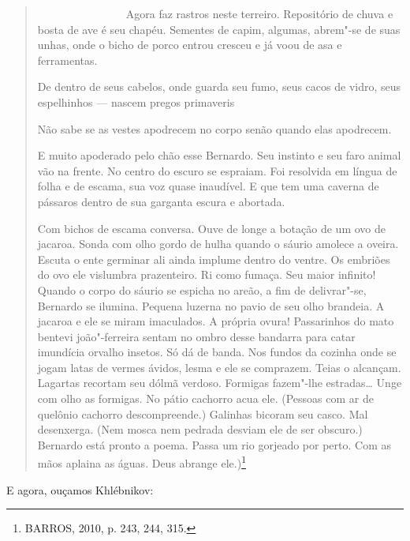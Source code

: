 \begin{quote}
~~~~~~~~~~~~~~~~Agora faz rastros neste terreiro. Repositório de chuva e
bosta de ave é seu chapéu. Sementes de capim, algumas, abrem"-se de suas
unhas, onde o bicho de porco entrou cresceu e já voou de asa e
ferramentas.

De dentro de seus cabelos, onde guarda seu fumo, seus cacos de vidro,
seus espelhinhos --- nascem pregos primaveris

Não sabe se as vestes apodrecem no corpo senão quando elas apodrecem.

E muito apoderado pelo chão esse Bernardo. Seu instinto e seu faro
animal vão na frente. No centro do escuro se espraiam. Foi resolvida em
língua de folha e de escama, sua voz quase inaudível. E que tem uma
caverna de pássaros dentro de sua garganta escura e abortada.

Com bichos de escama conversa. Ouve de longe a botação de um ovo de
jacaroa. Sonda com olho gordo de hulha quando o sáurio amolece a oveira.
Escuta o ente germinar ali ainda implume dentro do ventre. Os embriões
do ovo ele vislumbra prazenteiro. Ri como fumaça. Seu maior infinito!
Quando o corpo do sáurio se espicha no areão, a fim de delivrar"-se,
Bernardo se ilumina. Pequena luzerna no pavio de seu olho brandeia. A
jacaroa e ele se miram imaculados. A própria ovura! Passarinhos do mato
bentevi joão"-ferreira sentam no ombro desse bandarra para catar
imundícia orvalho insetos. Só dá de banda. Nos fundos da cozinha onde se
jogam latas de vermes ávidos, lesma e ele se comprazem. Teias o
alcançam. Lagartas recortam seu dólmã verdoso. Formigas fazem"-lhe
estradas\ldots{} Unge com olho as formigas. No pátio cachorro acua ele.
(Pessoas com ar de quelônio cachorro descompreende.) Galinhas bicoram
seu casco. Mal desenxerga. (Nem mosca nem pedrada desviam ele de ser
obscuro.) Bernardo está pronto a poema. Passa um rio gorjeado por perto.
Com as mãos aplaina as águas. Deus abrange ele.)\footnote{BARROS, 2010,
  p. 243, 244, 315.}
\end{quote}

E agora, ouçamos Khlébnikov:


